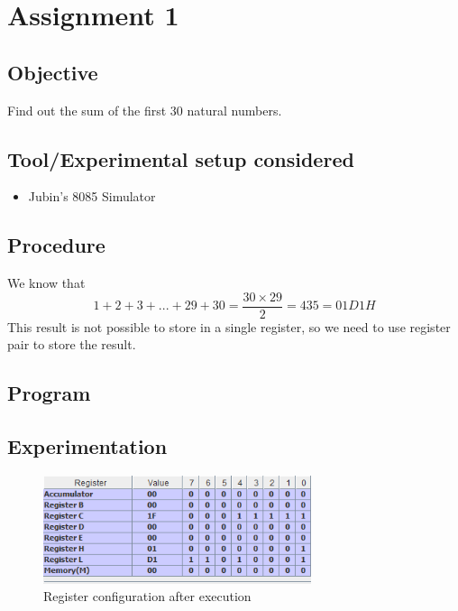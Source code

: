 \documentclass[a4paper]{article} %
\begin{document}

\setcounter{tocdepth}{1} %
\tableofcontents
\newpage
{}
\setcounter{page}{1}
\section[Find out the sum of the first 30 natural numbers]{Assignment 1} %
    \subsection{Objective}
        Find out the sum of the first 30 natural numbers.
    \subsection{Tool/Experimental setup considered}
        \begin{itemize}
            \item Jubin's 8085 Simulator
        \end{itemize}
    \subsection{Procedure}
        We know that
        \[1 + 2 + 3 + ... + 29 + 30 = \frac{30 \times 29}{2} = 435 =  01D1H\]
        This result is not possible to store in a single register, so we need to use register pair to store the result.
    \subsection{Program}
        
        
    \subsection{Experimentation}
        \begin{figure}[h!]
            \centering
            \includegraphics[width=0.7\textwidth]{Assignment 1/1_sum_till_30/registor.png}
            \caption{Register configuration after execution}
            \label{fg1}
        \end{figure} 
\end{document}
